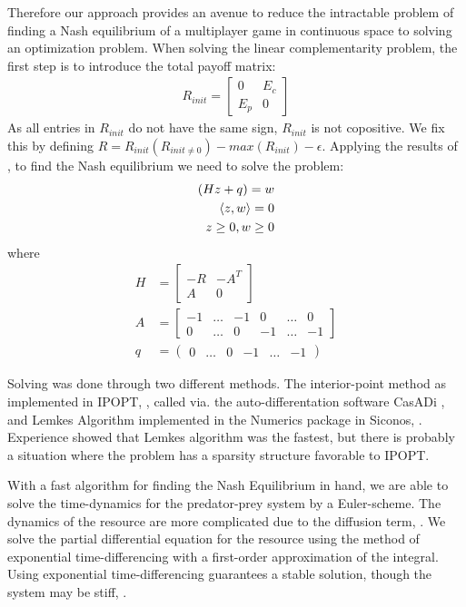 Therefore our approach provides an avenue to reduce the intractable problem of finding a Nash equilibrium of a multiplayer game in continuous space to solving an optimization problem.
When solving the linear complementarity problem, the first step is to introduce the total payoff matrix:
\begin{align*}
	R_{init} = \begin{bmatrix} 0 & E_c \\ E_p & 0 \end{bmatrix}
\end{align*}
As all entries in $R_{init}$ do not have the same sign, $R_{init}$ is not copositive. We fix this by defining $R=R_{init}(R_{init \neq 0})-max(R_{init})-\epsilon$.
Applying the results of \citep{miller1991copositive}, to find the Nash equilibrium we need to solve the problem:
\begin{align}
	(Hz+q) = w & \\
	\left \langle z,w \right \rangle = 0 & \\
	z\geq 0, w\geq 0
  \label{eq:lcp}
\end{align}
where
\begin{align*}
  H &= \begin{bmatrix} -R & -A^T \\ A & 0 \end{bmatrix} \\
	A &= \begin{bmatrix} -1 & \dots & -1 & 0 & \dots & 0 \\ 0 & \dots & 0 & -1 & \dots & -1 \end{bmatrix} \\
	q &= \begin{pmatrix} 0 & \dots & 0 & -1 & \dots & -1 \end{pmatrix}
\end{align*}

Solving  was done through two different methods. The interior-point method as implemented in IPOPT, \citep{wachter2006implementation}, called via. the auto-differentation software CasADi \citep{Andersson2019}, and Lemkes Algorithm implemented in the Numerics package in Siconos, \citep{acary2019introduction}. Experience showed that Lemkes algorithm was the fastest, but there is probably a situation where the problem has a sparsity structure favorable to IPOPT.

With a fast algorithm for finding the Nash Equilibrium in hand, we are able to solve the time-dynamics for the predator-prey system by a Euler-scheme. The dynamics of the resource are more complicated due to the diffusion term, . We solve the partial differential equation for the resource using the method of exponential time-differencing with a first-order approximation of the integral. Using exponential time-differencing guarantees a stable solution, though the system may be stiff, \cite{hochbruck2010exponential}. %

